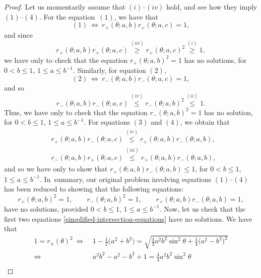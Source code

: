 \documentclass[pdftex]{sigma}
\numberwithin{equation}{section}
\begin{document}
\begin{proof}
Let us momentarily assume that $(i)$--$(iv)$ hold, and see how they imply $(1)$--$(4)$. For the equation~$(1)$, we have that
 \begin{equation*}
 (1) \ \Longleftrightarrow \ r_{+}(\theta;a,b)r_{+}(\theta;a,c) = 1,
 \end{equation*}
and since
 \begin{equation*}
 r_{+}(\theta;a,b)r_{+}(\theta;a,c) \overset{(iii)}{\geq} r_{+}(\theta;a,c)^2 \overset{(i)}{\geq} 1,
 \end{equation*}
we have only to check that the equation $r_{+}(\theta;a,b)^2 = 1$ has no solutions, for $0< b \leq 1$, $1 \leq a \leq b^{-1}$.
Similarly, for equation $(2)$,
 \begin{equation*}
 (2) \ \Longleftrightarrow \ r_{-}(\theta;a,b)r_{-}(\theta;a,c) = 1,
 \end{equation*}
and so
 \begin{equation*}
 r_{-}(\theta;a,b)r_{-}(\theta;a,c) \overset{(iv)}{\leq} r_{-}(\theta;a,b)^2 \overset{(ii)}{\leq} 1.
 \end{equation*}
 Thus, we have only to check that the equation $r_{-}(\theta;a,b)^2 = 1$ has no solution, for $0< b \leq 1$, $1 \leq a \leq b^{-1}$.
 For equations $(3)$ and $(4)$, we obtain that
 \begin{align*}
 &r_+(\theta;a,b)r_-(\theta;a,c)\overset{(iv)}{\leq} r_+(\theta;a,b) r_-(\theta;a,b),\\
 &r_{-}(\theta;a,b)r_+(\theta;a,c)\overset{(iii)}{\leq} r_+(\theta;a,b) r_-(\theta;a,b),
 \end{align*}
and so we have only to show that $r_+(\theta;a,b) r_-(\theta;a,b) \leq 1$, for $0< b \leq 1$, $1 \leq a \leq b^{-1}$. In~summary, our original problem involving equations $(1)$--$(4)$ has been reduced to showing that the following equations:
 \begin{equation}\label{simplified-intersection-equations}
 r_+(\theta;a,b)^2 = 1, \qquad r_-(\theta;a,b)^2 = 1,\qquad r_+(\theta;a,b)r_-(\theta;a,b) = 1,
 \end{equation}
have no solutions, provided $0< b \leq 1$, $1 \leq a \leq b^{-1}$.
Now, let us check that the first two equations \eqref{simplified-intersection-equations} have no solutions. We have that
 \begin{align*}
 1 =r_{\pm}(\theta)^2 \ \Longleftrightarrow \ {}& 1-\frac{1}{2}\bigl(a^2+b^2\bigr) = \sqrt{\frac{4}{3} a^2b^2 \sin^2\theta + \frac{1}{4}\bigl(a^2-b^2\bigr)^2}\\
 \Longleftrightarrow \ {}& a^2b^2- a^2 -b^2 + 1 = \frac{4}{3} a^2b^2 \sin^2\theta\\

\end{align*}
\end{proof}
\end{document}
